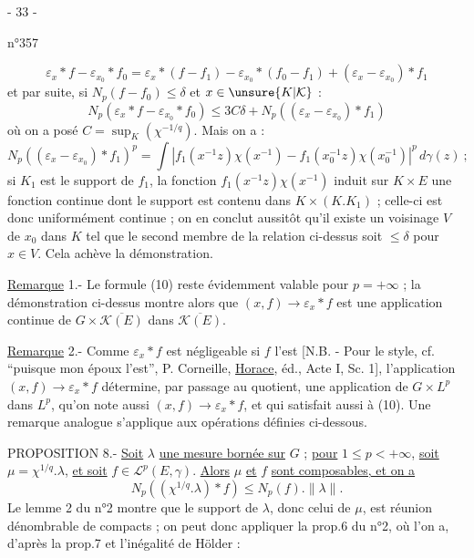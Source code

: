 \begin{center}- 33 -\end{center}
\begin{flushright}n°357\end{flushright}
\[
\varepsilon_x*f-\varepsilon_{x_0}*f_0
=\varepsilon_x*(f-f_1)-\varepsilon_{x_0}*(f_0-f_1)+(\varepsilon_x-\varepsilon_{x_0})*f_1
\]
et par suite, si $N_p(f-f_0)\leq\delta$ et $x\in\unsure{K|\mathcal K}$ :
\[
N_p(\varepsilon_x*f-\varepsilon_{x_0}*f_0)\leq3C\delta+N_p((\varepsilon_x-\varepsilon_{x_0})*f_1)
\]
où on a posé $C=\sup_K(\chi^{-1/q})$. Mais on a :
\[
N_p((\varepsilon_x-\varepsilon_{x_0})*f_1)^p
=\int\left|f_1(x^{-1}z)\chi(x^{-1})-f_1(x_0^{-1}z)\chi(x_0^{-1})\right|^p\,d\gamma(z)\ ;
\]
si $K_1$ est le support de $f_1$, la fonction $f_1(x^{-1}z)\chi(x^{-1})$ induit sur $K\times E$ une fonction continue dont le support est contenu dans $K\times(K.K_1)$ ; celle-ci est donc uniformément continue ; on en conclut aussitôt qu'il existe un voisinage $V$ de $x_0$ dans $K$ tel que le second membre de la relation ci-dessus soit $\leq\delta$ pour $x\in V$. Cela achève la démonstration.

\uline{Remarque} 1.- Le formule (10) reste évidemment valable pour $p=+\infty$ ; la démonstration ci-dessus montre alors que $(x,f)\to\varepsilon_x*f$ est une application continue de $G\times\overline{\mathcal K(E)}$ dans $\overline{\mathcal K(E)}$.

\uline{Remarque} 2.- Comme $\varepsilon_x*f$ est négligeable si $f$ l'est [N.B. - Pour le style, cf. ``puisque mon époux l'est'', P. Corneille, \uline{Horace},  éd., Acte I, Sc. 1], l'application $(x,f)\to\varepsilon_x*f$ détermine, par passage au quotient, une application de $G\times L^p$ dans $L^p$, qu'on note aussi $(x,f)\to\varepsilon_x*f$, et qui satisfait aussi à (10). Une remarque analogue s'applique aux opérations définies ci-dessous.

PROPOSITION 8.- \uline{Soit} $\lambda$ \uline{une mesure bornée sur} $G$ ; \uline{pour} $1\leq p<+\infty$, \uline{soit} $\mu=\chi^{1/q}.\lambda$, \uline{et soit} $f\in\mathcal L^p(E,\gamma)$. \uline{Alors} $\mu$ \uline{et} $f$ \uline{sont composables, et on a}
\[
\tag{11}
N_p((\chi^{1/q}.\lambda)*f)\leq N_p(f).\lVert\lambda\rVert.
\]
Le lemme 2 du n°2 montre que le support de $\lambda$, donc celui de $\mu$, est réunion dénombrable de compacts ; on peut donc appliquer la prop.6 du n°2, où l'on a, d'après la prop.7 et l'inégalité de Hölder :
